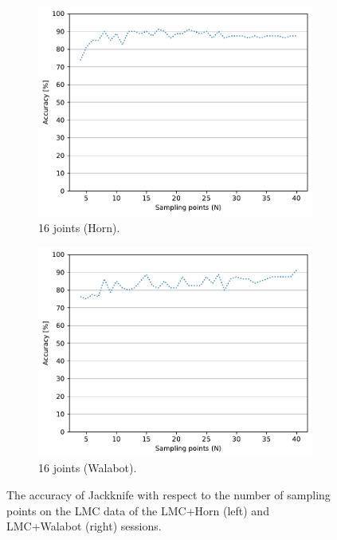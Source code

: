 \begin{figure}[htbp]
    \begin{subfigure}{.49\textwidth}
        \centering
        \includegraphics[width=.99\linewidth]{Figures/RadarExperiments/Datasets/SensorsComparison/LMC/LMC+Horn-samples-16.pdf}  
        \vspace{-15pt}
        \captionsetup{width=.99\linewidth}
        \caption{16 joints (Horn).}
        \label{fig:radar-experiments:sensors:lmc-samples:horn-16}
    \end{subfigure}
    \begin{subfigure}{.49\textwidth}
        \centering
        \includegraphics[width=.99\linewidth]{Figures/RadarExperiments/Datasets/SensorsComparison/LMC/LMC+Walabot-samples-16.pdf}  
        \vspace{-15pt}
        \captionsetup{width=.99\linewidth}
        \caption{16 joints (Walabot).}
        \label{fig:radar-experiments:sensors:lmc-samples:walabot-16}
    \end{subfigure}
    \caption{The accuracy of Jackknife with respect to the number of sampling points on the LMC data of the LMC+Horn (left) and LMC+Walabot (right) sessions.}
    \label{fig:radar-experiments:sensors:lmc-samples}
\end{figure}


